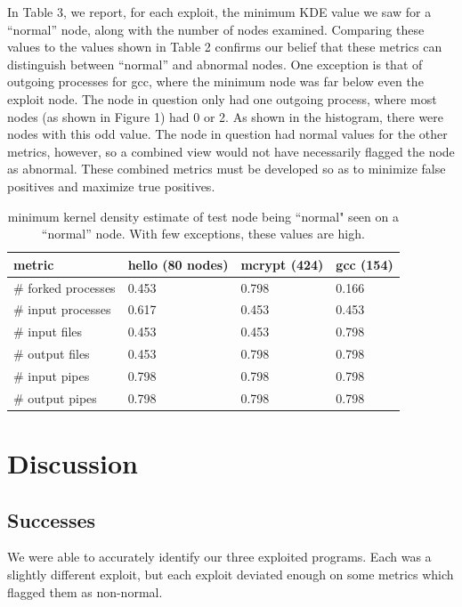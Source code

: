 \documentclass[10pt,twocolumn]{article}
\begin{document}
In Table 3, we report, for each exploit, the minimum KDE value we saw for a ``normal'' node, along with the number of nodes examined. Comparing these values to the values shown in Table 2 confirms our belief that these metrics can distinguish between ``normal'' and abnormal nodes. One exception is that of outgoing processes for gcc, where the minimum node was far below even the exploit node. The node in question only had one outgoing process, where most nodes (as shown in Figure 1) had 0 or 2. As shown in the histogram, there were nodes with this odd value. The node in question had normal values for the other metrics, however, so a combined view would not have necessarily flagged the node as abnormal. These combined metrics must be developed so as to minimize false positives and maximize true positives.
\begin{table}[ht]
\label{results}
{\small
  \begin{center}
  \begin{tabular}{| l | l | l | l |}
    \hline
    metric & hello (80 nodes) & mcrypt (424) & gcc (154) \\ \hline
     \# forked processes & 0.453 & 0.798 & 0.166\\ \hline
     \# input processes &  0.617 & 0.453 & 0.453\\ \hline

     \# input files & 0.453 & 0.453 & 0.798\\ \hline
     \# output files &  0.453 & 0.798 & 0.798\\ \hline

     \# input pipes & 0.798 & 0.798 & 0.798\\ \hline
     \# output pipes &  0.798 & 0.798 & 0.798\\ \hline

    \hline
  \end{tabular}
  \end{center}
}
\hfill{}
\caption{minimum kernel density estimate of test node being ``normal" seen on a ``normal'' node. With few exceptions, these values are high.
}
\label{tb:tablename}
\end{table}

\section{Discussion}
\subsection{Successes}
We were able to accurately identify our three exploited programs. Each was a slightly different exploit, but each exploit deviated enough on some metrics which flagged them as non-normal. 
\end{document}
